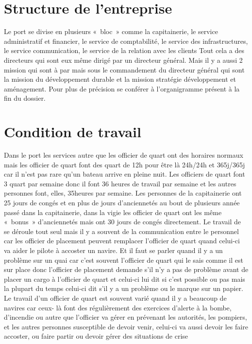 \section{Structure de l'entreprise}
Le port se divise en plusieurs « bloc » comme 
la capitainerie,
le service administratif et financier,
le service de comptabilité,
le service des infrastructures,
le service communication,
le service de la relation avec les clients
Tout cela a des directeurs qui sont eux même dirigé par un directeur général.
Mais il y a aussi 2 mission qui sont à par mais sous le commandement du directeur général
qui sont la mission du développement durable et la mission stratégie développement et aménagement.
Pour plus de précision se conférer à l'organigramme présent à la fin du dossier.


\section{Condition de travail}
Dans le port les services autre que les officier de quart ont des horaires normaux 
mais les officier de quart font des quart de 12h pour être là 24h/24h et 365j/365j 
car il n'est pas rare qu'un bateau arrive en pleine nuit.
Les officiers de quart font 3 quart par semaine donc il font 36 heures de travail par semaine
et les autres personnes font, elles, 35heures par semaine.
Les personnes de la capitainerie ont 25 jours de congés et en plus de jours d'anciennetés
au bout de plusieurs année passé dans la capitainerie,
dans la vigie les officier de quart ont les même « bonus » d’anciennetés mais ont 30 jours de congés directement.
Le travail de se déroule tout seul mais il y a souvent de la communication entre le personnel
car les officier de placement peuvent remplacer l'officier de quart quand celui-ci va aider
le pilote à accoster un navire.
Et il faut se parler quand il y a un problème sur un quai car c'est souvent l'officier de quart qui le sais
comme il est sur place donc l'officier de placement demande s'il n'y a pas de problème
avant de placer un cargo à l'officier de quart et celui-ci
lui dit si c'est possible ou pas mais la plupart du temps celui-ci dit s'il y a un problème
ou le marque sur un papier.
Le travail d'un officier de quart est souvent varié quand il y a beaucoup de navires
car ceux- là font des régulièrement des exercices d’alerte à la bombe, 
d’incendie ou autre que l'officier va gérer en prévenant les autorités, les pompiers,
et les autres personnes susceptible de devoir venir, celui-ci va aussi devoir les faire accoster,
ou faire partir ou devoir gérer des situations de crise
